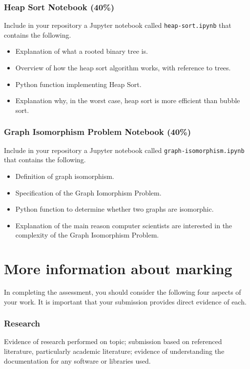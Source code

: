\documentclass[a4paper, 12pt]{scrartcl}
\begin{document}
  \subsubsection*{Heap Sort Notebook (40\%)}
  Include in your repository a Jupyter notebook called \texttt{heap-sort.ipynb} that contains the following.
  \begin{itemize}
    \item Explanation of what a rooted binary tree is.
    \item Overview of how the heap sort algorithm works, with reference to trees.
    \item Python function implementing Heap Sort.
    \item Explanation why, in the worst case, heap sort is more efficient than bubble sort.
  \end{itemize}
  
  \subsubsection*{Graph Isomorphism Problem Notebook (40\%)}
  Include in your repository a Jupyter notebook called \texttt{graph-isomorphism.ipynb} that contains the following.
  \begin{itemize}
    \item Definition of graph isomorphism.
    \item Specification of the Graph Iomorphism Problem.
    \item Python function to determine whether two graphs are isomorphic.
    \item Explanation of the main reason computer scientists are interested in the complexity of the Graph Isomorphism Problem.
  \end{itemize}

  \section*{More information about marking}
    In completing the assessment, you should consider the following four aspects of your work.
    It is important that your submission provides direct evidence of each.
    
    \subsubsection*{Research}
    Evidence of research performed on topic; submission based on referenced literature, particularly academic literature; evidence of understanding the documentation for any software or libraries used.
\end{document}

